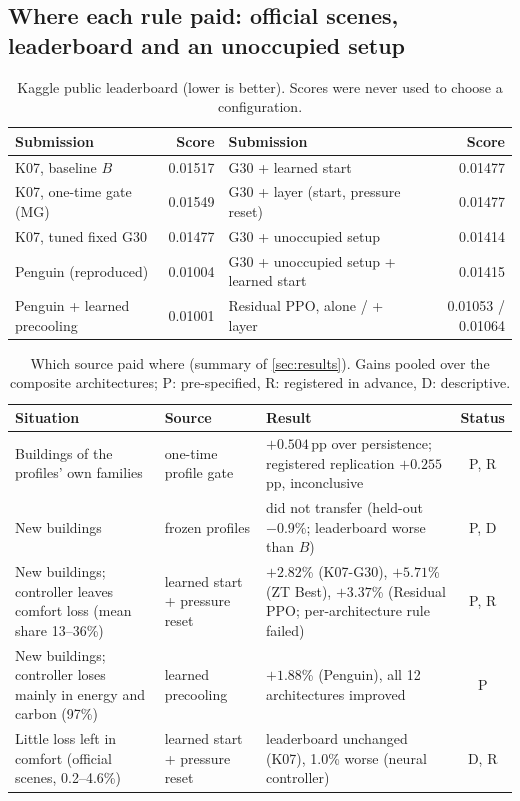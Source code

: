 \subsection{Where each rule paid: official scenes, leaderboard and an unoccupied setup}\label{app:j-paid}
\begin{table}[!htbp]
\centering
\caption{Kaggle public leaderboard (lower is better). Scores were never used to choose a configuration.}
\label{tab:lb}
\small
\begin{tabular}{lr@{\hspace{1.6em}}lr}
\toprule
Submission & Score & Submission & Score\\
\midrule
K07, baseline $B$            & 0.01517 & G30 + learned start                     & 0.01477\\
K07, one-time gate (MG)      & 0.01549 & G30 + layer (start, pressure reset)     & 0.01477\\
K07, tuned fixed G30         & 0.01477 & G30 + unoccupied setup                  & 0.01414\\
Penguin (reproduced)         & 0.01004 & G30 + unoccupied setup + learned start  & 0.01415\\
Penguin + learned precooling & 0.01001 & Residual PPO, alone / + layer & 0.01053 / 0.01064\\
\bottomrule
\end{tabular}
\end{table}
\begin{table}[!htbp]
\centering
\caption{Which source paid where (summary of \cref{sec:results}). Gains pooled over the composite architectures; P: pre-specified, R: registered in advance, D: descriptive.}
\label{tab:when}
\footnotesize
\setlength{\tabcolsep}{4pt}
\begin{tabular}{>{\raggedright\arraybackslash}p{3.7cm}>{\raggedright\arraybackslash}p{2.6cm}>{\raggedright\arraybackslash}p{5.2cm}c}
\toprule
Situation & Source & Result & Status\\
\midrule
Buildings of the profiles' own families & one-time profile gate & $+0.504$\,pp over persistence; registered replication $+0.255$\,pp, inconclusive & P, R\\
New buildings & frozen profiles & did not transfer (held-out $-0.9$\%; leaderboard worse than $B$) & P, D\\
New buildings; controller leaves comfort loss (mean share 13--36\%) & learned start + pressure reset & $+2.82$\% (K07-G30), $+5.71$\% (ZT Best), $+3.37$\% (Residual PPO; per-architecture rule failed) & P, R\\
New buildings; controller loses mainly in energy and carbon (97\%) & learned precooling & $+1.88$\% (Penguin), all 12 architectures improved & P\\
Little loss left in comfort (official scenes, 0.2--4.6\%) & learned start + pressure reset & leaderboard unchanged (K07), 1.0\% worse (neural controller) & D, R\\
\bottomrule
\end{tabular}
\end{table}
